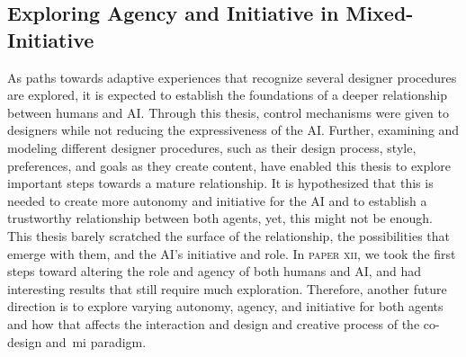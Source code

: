 

\subsection{Exploring Agency and Initiative in Mixed-Initiative}

As paths towards adaptive experiences that recognize several designer procedures are explored, it is expected to establish the foundations of a deeper relationship between humans and AI. Through this thesis, control mechanisms were given to designers while not reducing the expressiveness of the AI. Further, examining and modeling different designer procedures, such as their design process, style, preferences, and goals as they create content, have enabled this thesis to explore important steps towards a mature relationship. It is hypothesized that this is needed to create more autonomy and initiative for the AI and to establish a trustworthy relationship between both agents, yet, this might not be enough. This thesis barely scratched the surface of the relationship, the possibilities that emerge with them, and the AI's initiative and role. In \textsc{paper xii}, we took the first steps toward altering the role and agency of both humans and AI, and had interesting results that still require much exploration. Therefore, another future direction is to explore varying autonomy, agency, and initiative for both agents and how that affects the interaction and design and creative process of the co-design and~\acrshort{mi} paradigm.

